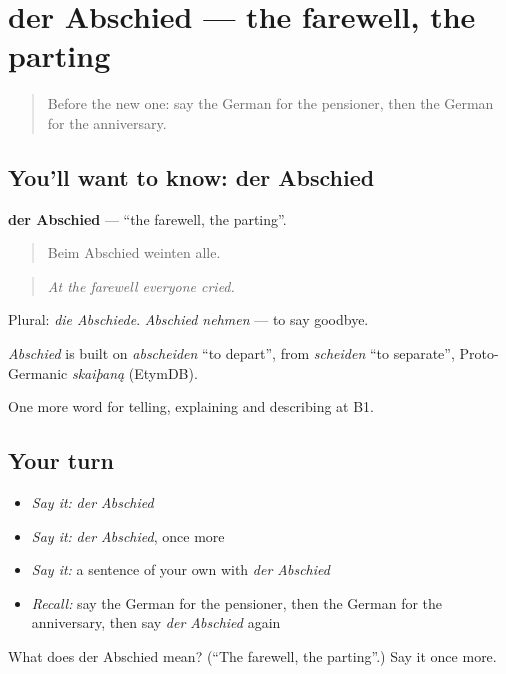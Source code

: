 \section[der Abschied]{der Abschied — the farewell, the parting}

\label{lesson:GE-C302-abschied}



\begin{quote}
Before the new one: say the German for the pensioner, then the German for the anniversary.
\end{quote}

\subsection*{You'll want to know: der Abschied}
\textbf{der Abschied} — \textquotedblleft{}the farewell, the parting\textquotedblright{}.

\begin{quote}
Beim Abschied weinten alle.
\end{quote}

\begin{quote}
\emph{At the farewell everyone cried.}
\end{quote}

Plural: \emph{die Abschiede}. \emph{Abschied nehmen} — to say goodbye.

\begin{cousinweb}
\emph{Abschied} is built on \emph{abscheiden} \textquotedblleft{}to depart\textquotedblright{}, from \emph{scheiden} \textquotedblleft{}to separate\textquotedblright{}, Proto-Germanic \emph{skaiþaną} (EtymDB).
\end{cousinweb}

\begin{grammarlens}[title={What you've built}]
One more word for telling, explaining and describing at B1.
\end{grammarlens}

\subsection*{Your turn}
\begin{itemize}
\raggedright
  \item \emph{Say it:} \emph{der Abschied}
  \item \emph{Say it:} \emph{der Abschied}, once more
  \item \emph{Say it:} a sentence of your own with \emph{der Abschied}
  \item \emph{Recall:} say the German for the pensioner, then the German for the anniversary, then say \emph{der Abschied} again
\end{itemize}

\begin{tcolorbox}[breakable,colback=teal!4,colframe=teal!35!black,title={Before you move on}]
What does der Abschied mean? (\textquotedblleft{}The farewell, the parting\textquotedblright{}.) Say it once more.
\end{tcolorbox}
